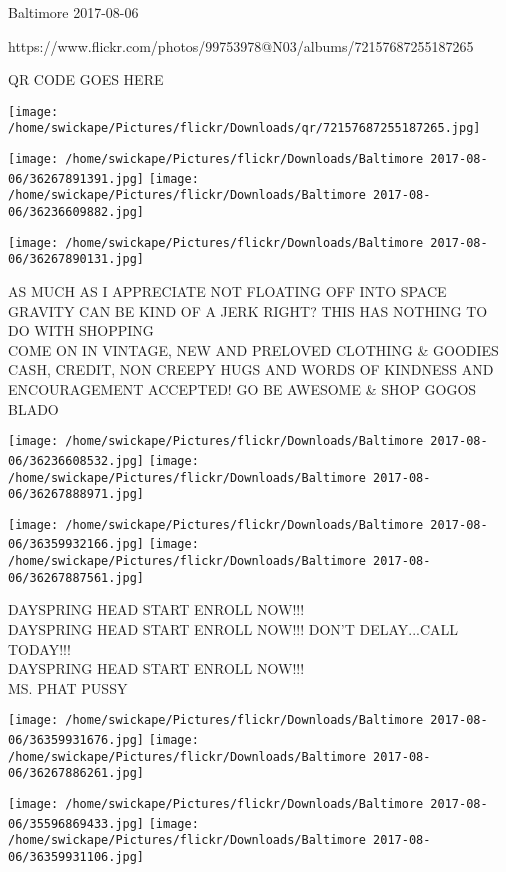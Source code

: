 \documentclass[10pt,letterpaper]{article}
\begin{document}
Baltimore 2017-08-06

https://www.flickr.com/photos/99753978@N03/albums/72157687255187265

QR CODE GOES HERE

\texttt{[image: /home/swickape/Pictures/flickr/Downloads/qr/72157687255187265.jpg]}
\pagebreak

\texttt{[image: /home/swickape/Pictures/flickr/Downloads/Baltimore 2017-08-06/36267891391.jpg]}
\texttt{[image: /home/swickape/Pictures/flickr/Downloads/Baltimore 2017-08-06/36236609882.jpg]}

\vspace{0.25in}
\texttt{[image: /home/swickape/Pictures/flickr/Downloads/Baltimore 2017-08-06/36267890131.jpg]}

AS MUCH AS I APPRECIATE NOT FLOATING OFF INTO SPACE GRAVITY CAN BE KIND OF A JERK RIGHT?  THIS HAS NOTHING TO DO WITH SHOPPING\\
COME ON IN VINTAGE, NEW AND PRELOVED CLOTHING \& GOODIES CASH, CREDIT, NON CREEPY HUGS AND WORDS OF KINDNESS AND ENCOURAGEMENT ACCEPTED!  GO BE AWESOME \& SHOP GOGOS\\
BLADO\\
\pagebreak

\texttt{[image: /home/swickape/Pictures/flickr/Downloads/Baltimore 2017-08-06/36236608532.jpg]}
\texttt{[image: /home/swickape/Pictures/flickr/Downloads/Baltimore 2017-08-06/36267888971.jpg]}

\texttt{[image: /home/swickape/Pictures/flickr/Downloads/Baltimore 2017-08-06/36359932166.jpg]}
\texttt{[image: /home/swickape/Pictures/flickr/Downloads/Baltimore 2017-08-06/36267887561.jpg]}

DAYSPRING HEAD START ENROLL NOW!!!\\
DAYSPRING HEAD START ENROLL NOW!!!  DON'T DELAY...CALL TODAY!!!\\
DAYSPRING HEAD START ENROLL NOW!!!\\
MS. PHAT PUSSY\\
\pagebreak

\texttt{[image: /home/swickape/Pictures/flickr/Downloads/Baltimore 2017-08-06/36359931676.jpg]}
\texttt{[image: /home/swickape/Pictures/flickr/Downloads/Baltimore 2017-08-06/36267886261.jpg]}

\texttt{[image: /home/swickape/Pictures/flickr/Downloads/Baltimore 2017-08-06/35596869433.jpg]}
\texttt{[image: /home/swickape/Pictures/flickr/Downloads/Baltimore 2017-08-06/36359931106.jpg]}
\end{document}
